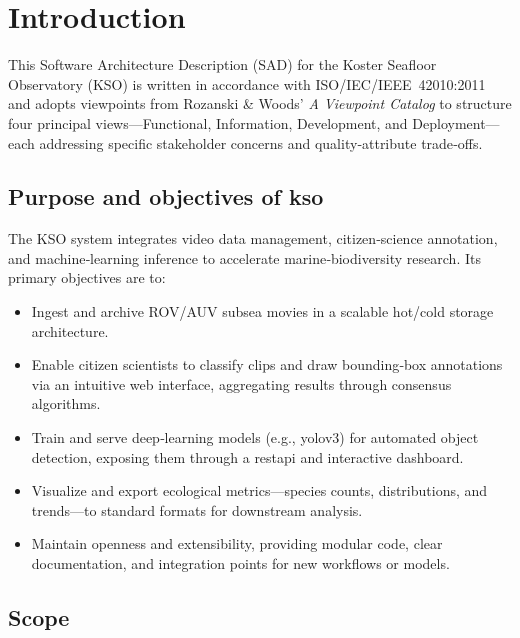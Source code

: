 
\chapter{Introduction} \label{introduction}


This Software Architecture Description (SAD) for the Koster Seafloor Observatory (KSO) is written in accordance with ISO/IEC/IEEE~42010:2011 \cite{iso29148} and adopts viewpoints from Rozanski \& Woods’ \emph{A Viewpoint Catalog} \cite{RW} to structure four principal views—Functional, Information, Development, and Deployment—each addressing specific stakeholder concerns and quality‐attribute trade‐offs.

\section{Purpose and objectives of \gls{kso}}

The KSO system integrates video data management, citizen‐science annotation, and machine‐learning inference to accelerate marine‐biodiversity research. Its primary objectives are to:
\begin{itemize}
  \item Ingest and archive ROV/AUV subsea movies in a scalable hot/cold storage architecture.
  \item Enable citizen scientists to classify clips and draw bounding‐box annotations via an intuitive web interface, aggregating results through consensus algorithms.
  \item Train and serve deep‐learning models (e.g., \gls{yolov3}) for automated object detection, exposing them through a \gls{restapi} and interactive dashboard. \cite{anton2021kso}
  \item Visualize and export ecological metrics—species counts, distributions, and trends—to standard formats for downstream analysis.
  \item Maintain openness and extensibility, providing modular code, clear documentation, and integration points for new workflows or models.
\end{itemize}

\section{Scope}

